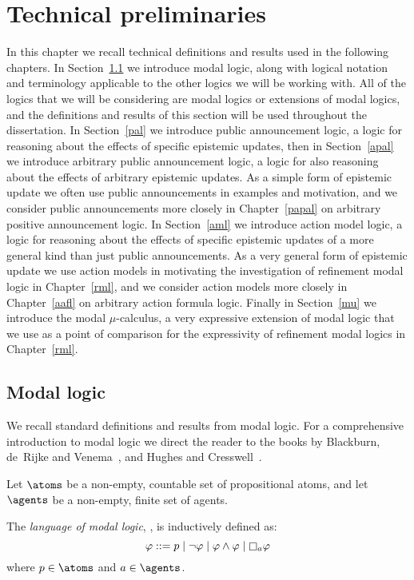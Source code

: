 \chapter{Technical preliminaries}\label{technical}

In this chapter we recall technical definitions and results used in the following chapters.
In Section~\ref{ml} we introduce modal logic, along with logical notation and terminology applicable to the other logics we will be working with.
All of the logics that we will be considering are modal logics or extensions of modal logics, and the definitions and results of this section will be used throughout the dissertation. 
In Section~\ref{pal} we introduce public announcement logic, a logic for reasoning about the effects of specific epistemic updates, then in Section~\ref{apal} we introduce arbitrary public announcement logic, a logic for also reasoning about the effects of arbitrary epistemic updates.
As a simple form of epistemic update we often use public announcements in examples and motivation, and we consider public announcements more closely in Chapter~\ref{papal} on arbitrary positive announcement logic.
In Section~\ref{aml} we introduce action model logic, a logic for reasoning about the effects of specific epistemic updates of a more general kind than just public announcements.
As a very general form of epistemic update we use action models in motivating the investigation of refinement modal logic in Chapter~\ref{rml}, and we consider action models more closely in Chapter~\ref{aafl} on arbitrary action formula logic.
Finally in Section~\ref{mu} we introduce the modal $\mu$-calculus, a very expressive extension of modal logic that we use as a point of comparison for the expressivity of refinement modal logics in Chapter~\ref{rml}.

\section{Modal logic}\label{ml}

We recall standard definitions and results from modal logic.
For a comprehensive introduction to modal logic we direct the reader to the books by Blackburn, de~Rijke and Venema~\cite{blackburn:2001}, and Hughes and Cresswell~\cite{hughes:1996}.

Let $\atoms$ be a non-empty, countable set of propositional atoms, and
let $\agents$ be a non-empty, finite set of agents.

\begin{definition}
The {\em language of modal logic}, \langMl{}, is inductively defined as:
$$
\phi ::= 
    \atomP \mid
    \lnot \phi \mid
    \phi \land \phi \mid
    \necessaryA \phi
$$
where $\atomP \in \atoms$ and $\agentA \in \agents$.
\end{definition}

